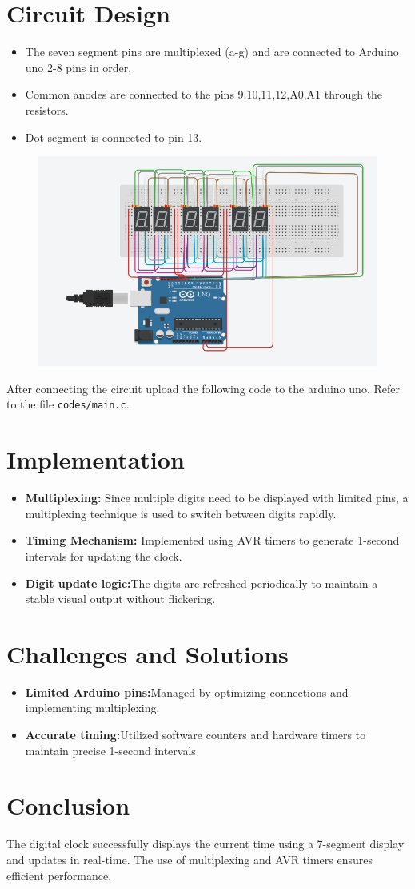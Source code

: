 \documentclass[journal]{IEEEtran}
\begin{document}
 \section*{\textbf{Circuit Design}}
 \begin{itemize}
     \item The seven segment pins are multiplexed (a-g) and are connected to Arduino uno 2-8 pins in order.
     \item Common anodes are connected to the pins 9,10,11,12,A0,A1 through the resistors.
     \item Dot segment is connected to pin 13.
 \end{itemize}
 \begin{figure}[H]
     \centering
     \includegraphics[width=0.8\linewidth]{figs/clockcircuit.jpeg}
 \end{figure}
 After connecting the circuit upload the following code to the arduino uno.
 Refer to the file \texttt{codes/main.c}.
 \section*{\textbf{Implementation}}
 \begin{itemize}
     \item \textbf{Multiplexing:} Since multiple digits need to be displayed with limited pins, a multiplexing technique is used to switch between digits rapidly.
     \item \textbf{Timing Mechanism:} Implemented using AVR timers to generate 1-second intervals for updating the clock.
    \item \textbf{Digit update logic:}The digits are refreshed periodically to maintain a stable visual output without flickering.
 \end{itemize}
\section*{\textbf{Challenges and Solutions}}
\begin{itemize}
    \item \textbf{Limited Arduino pins:}Managed by optimizing connections and implementing multiplexing.
    \item \textbf{Accurate timing:}Utilized software counters and hardware timers to maintain precise 1-second intervals
\end{itemize}
\section*{\textbf{Conclusion}}
The digital clock successfully displays the current time using a 7-segment display and updates in real-time. The use of multiplexing and AVR timers ensures efficient performance. 
\end{document}
